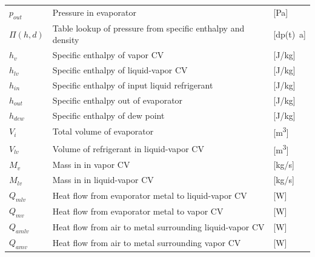 \begin{center}
	\begin{tabular}{l p{10cm} l}
		$ p_{out} $      & Pressure in evaporator                                                   & [\si{Pa}]                         \\
		$\Pi(h,d) $   & Table lookup of pressure from specific enthalpy and density              & [\si{{dp(t)}a}]                         \\
		$h_{v} $         & Specific enthalpy of vapor CV                                            & [\si{J}/\si{kg}]                  \\
		$h_{lv} $        & Specific enthalpy of liquid-vapor CV                                     & [\si{J}/\si{kg}]                  \\
		$h_{in} $        & Specific enthalpy of input liquid refrigerant                            & [\si{J}/\si{kg}]                  \\
		$h_{out}$        & Specific enthalpy out of evaporator                                      & [\si{J}/\si{kg}]                  \\
		$h_{dew}$        & Specific enthalpy of dew point                                           & [\si{J}/\si{kg}]                  \\
		$V_{i} $         & Total volume of evaporator                                               & [\si{m^3}]                        \\
		$V_{lv} $        & Volume of refrigerant in liquid-vapor CV                                 & [\si{m^3}]                        \\
		$M_{v}$          & Mass in	in vapor CV                                                      & [\si{kg}/\si{s}]                  \\
		$M_{lv}$         & Mass in	in liquid-vapor CV                                               & [\si{kg}/\si{s}]                  \\
		$Q_{mlv}$        & Heat flow from evaporator metal to liquid-vapor CV                       & [\si{W}]                          \\
		$Q_{mv}$         & Heat flow from evaporator metal to vapor CV                              & [\si{W}]                          \\
		$Q_{amlv}$       & Heat flow from air to metal surrounding liquid-vapor CV                  & [\si{W}]                          \\
		$Q_{amv}$        & Heat flow from air to metal surrounding vapor CV                         & [\si{W}]                          \\

\end{tabular}
\end{center}
